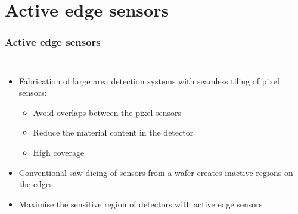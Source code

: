 \section{Active edge sensors}
\begin{frame}
  \frametitle{}
  \tableofcontents[currentsection]
\end{frame}
\begin{frame}
  \frametitle{Active edge sensors}

  \begin{columns}

    \begin{itemize}
    \item Fabrication of large area detection systems with seamless
      tiling of pixel sensors:
     \begin{itemize}
      \item Avoid overlaps between the pixel sensors
      \item Reduce the material content in the detector
      \item High coverage
      \end{itemize}
    \item Conventional saw dicing of sensors from a wafer creates
      inactive regions on the edges.
    \item Maximise the sensitive region of detectors with active edge
      sensors
    \end{itemize}

    \vspace{-0.8cm}
\end{columns}
\end{frame}
